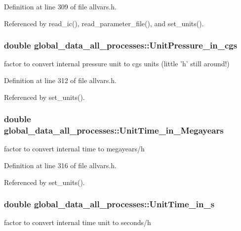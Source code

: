 Definition at line 309 of file allvars.h.



Referenced by read\_\-ic(), read\_\-parameter\_\-file(), and set\_\-units().

\hypertarget{structglobal__data__all__processes_a4938f30bc3da1d4583d42f806ad11201}{
\subsubsection[{UnitPressure\_\-in\_\-cgs}]{\setlength{\rightskip}{0pt plus 5cm}double {\bf global\_\-data\_\-all\_\-processes::UnitPressure\_\-in\_\-cgs}}}
\label{structglobal__data__all__processes_a4938f30bc3da1d4583d42f806ad11201}
factor to convert internal pressure unit to cgs units (little 'h' still around!) 

Definition at line 312 of file allvars.h.



Referenced by set\_\-units().

\hypertarget{structglobal__data__all__processes_a833ed48234b2780d7a668ae90c84318e}{
\subsubsection[{UnitTime\_\-in\_\-Megayears}]{\setlength{\rightskip}{0pt plus 5cm}double {\bf global\_\-data\_\-all\_\-processes::UnitTime\_\-in\_\-Megayears}}}
\label{structglobal__data__all__processes_a833ed48234b2780d7a668ae90c84318e}
factor to convert internal time to megayears/h 

Definition at line 316 of file allvars.h.



Referenced by set\_\-units().

\hypertarget{structglobal__data__all__processes_a4fa94d45bad042101623c3403f6b8c37}{
\subsubsection[{UnitTime\_\-in\_\-s}]{\setlength{\rightskip}{0pt plus 5cm}double {\bf global\_\-data\_\-all\_\-processes::UnitTime\_\-in\_\-s}}}
\label{structglobal__data__all__processes_a4fa94d45bad042101623c3403f6b8c37}
factor to convert internal time unit to seconds/h 

